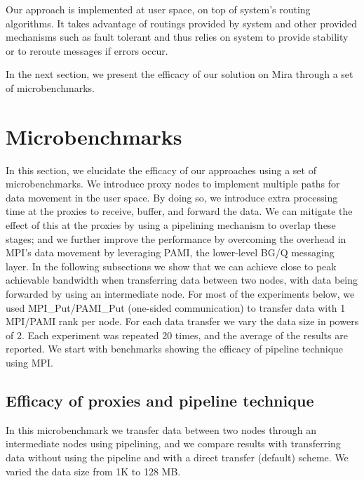 \documentclass[final,5p,times]{elsarticle}
\begin{document}
Our approach is implemented at user space, on top of system's routing algorithms. It takes advantage of routings provided by system and other provided mechanisms such as fault tolerant and thus relies on system to provide stability or to reroute messages if errors occur.

In the next section, we present the efficacy of our solution on Mira through a set of microbenchmarks.

\section{Microbenchmarks}
\label{sec:microbenchmark}
In this section, we elucidate the efficacy of our approaches using a set of microbenchmarks.
We introduce proxy nodes to implement multiple paths for data movement in the user space. By doing so, we introduce extra processing time at the proxies to receive, buffer, and forward the data. We can mitigate the effect of this at the proxies by using a pipelining mechanism to overlap these stages; and we further improve the performance by overcoming the overhead in MPI's data movement by leveraging PAMI, the lower-level BG/Q messaging layer.
In the following subsections we show that we can achieve close to peak achievable bandwidth when transferring data between two nodes, with data being forwarded by using an intermediate node. For most of the experiments below, we used MPI\_Put/PAMI\_Put (one-sided communication) to transfer data with 1 MPI/PAMI rank per node. For each data transfer we vary the data size in powers of 2. Each experiment was repeated 20 times, and the average of the results are reported. We start with benchmarks showing the efficacy of pipeline technique using MPI.

\subsection{Efficacy of proxies and pipeline technique}

In this microbenchmark we transfer data between two nodes through an intermediate nodes using pipelining, and we compare results with transferring data without using the pipeline and with a direct transfer (default) scheme. We varied the data size from 1K  to 128 MB.
\end{document}
